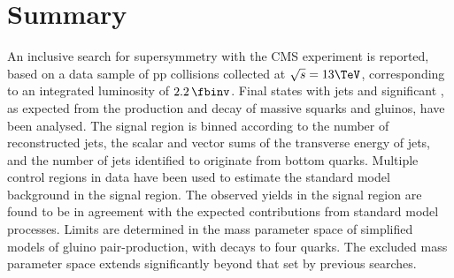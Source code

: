 \section{Summary}
\label{sec:summary}

An inclusive search for supersymmetry with the CMS experiment is
reported, based on a data sample of pp collisions collected at
$\sqrt{s} = 13\TeV$, corresponding to an integrated luminosity of $2.2\, \fbinv$. 
Final states with jets and significant \met, as
expected from the production and decay of massive squarks and gluinos,
have been analysed.  The signal region is binned according to the
number of reconstructed jets, the scalar and vector sums of the
transverse energy of jets, and the number of jets identified to
originate from bottom quarks. 
Multiple control regions in data have been used to estimate the standard model background in 
the signal region. 
The observed yields in the signal region are found to be in agreement with
the expected contributions from standard model processes. Limits are
determined in the mass parameter space of simplified models of gluino
pair-production, with decays to four quarks.  The excluded mass
parameter space extends significantly beyond that set by previous
searches.

